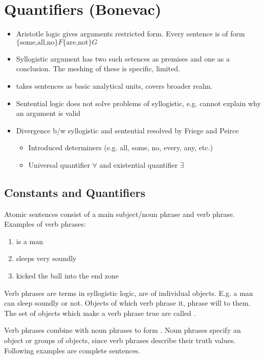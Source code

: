 \section{Quantifiers (Bonevac)}

\begin{itemize}
    \item Aristotle logic gives arguments restricted form. Every sentence is of form $\{\text{some,all,no}\}F\{\text{are,not}\}G$
    \item Syllogistic argument has two such setences as premises and one as a conclusion. The meshing of these is specific, limited.
    \item {} takes sentences as basic analytical units, covers broader realm.
    \item Sentential logic does not solve problems of syllogistic, e.g. cannot explain why an argument is valid
    \item Divergence b/w syllogistic and sentential resolved by Friege and Peirce
    \begin{itemize}
        \item Introduced determiners (e.g. all, some, no, every, any, etc.)
        \item Universal quantifier $\forall$ and existential quantifier $\exists$
    \end{itemize}
\end{itemize}

\subsection{Constants and Quantifiers}

Atomic sentences consist of a main subject/noun phrase and verb phrase. Examples of verb phrases:

\begin{enumerate}
    \item is a man
    \item sleeps very soundly
    \item kicked the ball into the end zone
\end{enumerate}

Verb phrases are terms in syllogistic logic, are  of individual objects. E.g. a man can sleep soundly or not.
Objects of which verb phrase  it, phrase will  to them.
The set of objects which make a verb phrase true are called .

Verb phrases combine with noun phrases to form . Noun phrases specify an object or groups of objects, since verb phrases describe their truth values.
Following examples are complete sentences.

